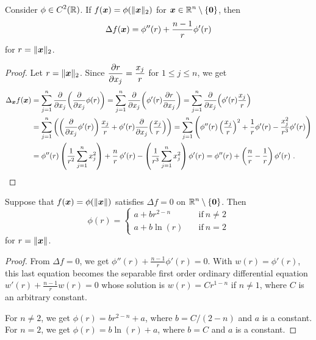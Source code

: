 \begin{prop} \label{laplace_spheric}
Consider $\displaystyle \phi \in C^2(\mathbb{R})$.
If $f({\bm{x}}) = \phi(\|{\bm{x}}\|_2)$ for
$\displaystyle {\bm{x}}\in \mathbb{R}^n\setminus \{{\bm{0}}\}$, then
\[
\Delta f({\bm{x}}) = \phi''(r) + \frac{n-1}{r} \phi'(r)
\]
for $r = \|{\bm{x}}\|_2$.
\end{prop}

\begin{proof}
Let $r = \|{\bm{x}}\|_2$.  Since
$\displaystyle \frac{\partial{r}}{\partial x_j} = \frac{x_j}{r}$ for $1 \leq j \leq n$, we get
\begin{align*}
\Delta_{\VEC{x}} f(\VEC{x})
&= \sum_{j=1}^n \pdfdx{\left(\pdfdx{\phi(r)}{x_j}\right)}{x_j}
= \sum_{j=1}^n \pdfdx{\left(\phi'(r)\pdydx{r}{x_j}\right)}{x_j}
= \sum_{j=1}^n \pdfdx{\left(\phi'(r) \frac{x_j}{r} \right)}{x_j} \\
&= \sum_{j=1}^n \left( \left(\pdfdx{\phi'(r)}{x_j}\right) \frac{x_j}{r}
+ \phi'(r) \pdfdx{\left(\frac{x_j}{r}\right)}{x_j}\right)
= \sum_{j=1}^n \left(
\phi''(r) \left(\frac{x_j}{r}\right)^2 + \frac{1}{r} \phi'(r) -
\frac{x_j^2}{r^3}\phi'(r) \right) \\
&= \phi''(r)\left( \frac{1}{r^2}\sum_{j=1}^n x_j^2\right)
+ \frac{n}{r}\, \phi'(r) - \left(\frac{1}{r^3}\sum_{j=1}^n x_j^2\right) \phi'(r)
= \phi''(r) + \left(\frac{n}{r} - \frac{1}{r}\right) \phi'(r) \ .  \qedhere
\end{align*}
\end{proof}

\begin{cor} \label{laplace_sharm}
Suppose that $f({\bm{x}}) = \phi(\|{\bm{x}}\|)$ satisfies
$\Delta f = 0$ on $\displaystyle \mathbb{R}^n \setminus \{{\bm{0}}\}$.  Then
\[
\phi(r) =
\begin{cases}
a + b r^{2-n} & \quad \text{if} \ n \neq 2 \\
a+b \ln(r) & \quad \text{if} \ n=2
\end{cases}
\]
for $r = \|{\bm{x}}\|$.
\end{cor}

\begin{proof}
From $\Delta f = 0$, we get
$\displaystyle \phi''(r) + \frac{n-1}{r} \phi'(r) = 0$.
With $w(r) = \phi'(r)$, this last equation becomes the separable first
order ordinary differential equation
$\displaystyle w'(r) + \frac{n-1}{r} w(r) = 0$
whose solution is $w(r) = C r^{1-n}$ if $n\neq 1$, where $C$
is an arbitrary constant.

For $n\neq 2$, we get $\phi(r) = b r^{2-n} + a$,
where $b=C/(2-n)$ and $a$ is a constant.  For $n=2$, we get
$\phi(r) = b\ln(r) + a$, where $b=C$ and $a$ is a constant.
\end{proof}

